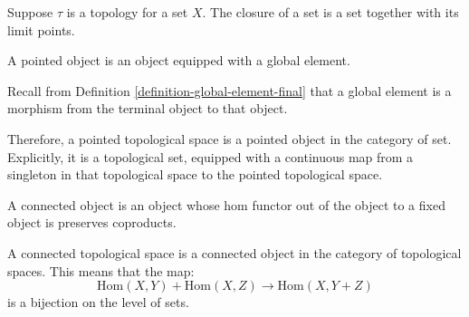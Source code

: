 \begin{definition}
	\label{definition-closure}
	Suppose $\tau$ is a topology for a set $X$.
	The closure of a set is a set together with its limit points.
\end{definition}

\begin{definition}
    \label{definition-pointed-topological-space}
    A pointed object is an object equipped with a global element.

    Recall from Definition \ref{definition-global-element-final} that a global element is a morphism from the terminal object to that object.

    Therefore, a pointed topological space is a pointed object in the category of set. Explicitly, it is a topological set, equipped with a continuous map from a singleton in that topological space to the pointed topological space.
\end{definition}

\begin{definition}
    \label{definition-connected-topological-space}
    A connected object is an object whose hom functor out of the object to a fixed object is preserves coproducts.

	A connected topological space is a connected object in the category of topological spaces.
	This means that the map:
	\begin{equation}
		\mathrm{Hom}(X,Y) + \mathrm{Hom}(X,Z)
		\rightarrow \mathrm{Hom}(X,Y+Z)
	\end{equation}
	is a bijection on the level of sets.
\end{definition}